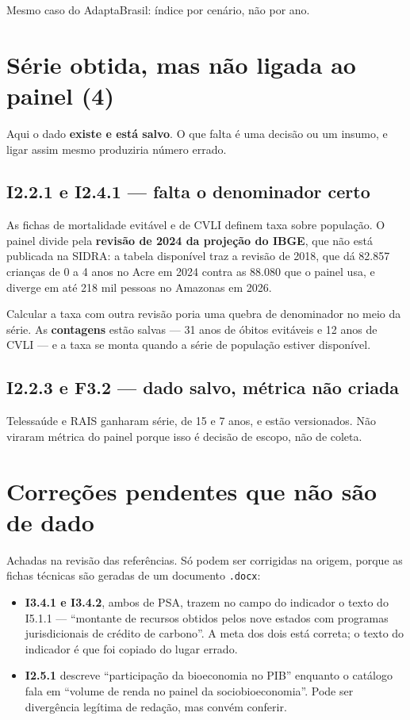 \documentclass[11pt,a4paper]{article}
\begin{document}
Mesmo caso do AdaptaBrasil: índice por cenário, não por ano.

\section{Série obtida, mas não ligada ao painel (4)}

Aqui o dado \textbf{existe e está salvo}. O que falta é uma decisão ou um insumo, e
ligar assim mesmo produziria número errado.

\subsection*{I2.2.1 e I2.4.1 --- falta o denominador certo}

As fichas de mortalidade evitável e de CVLI definem taxa sobre população. O painel
divide pela \textbf{revisão de 2024 da projeção do IBGE}, que não está publicada na
SIDRA: a tabela disponível traz a revisão de 2018, que dá 82.857 crianças de 0 a 4 anos
no Acre em 2024 contra as 88.080 que o painel usa, e diverge em até 218 mil pessoas no
Amazonas em 2026.

Calcular a taxa com outra revisão poria uma quebra de denominador no meio da série. As
\textbf{contagens} estão salvas --- 31 anos de óbitos evitáveis e 12 anos de CVLI --- e
a taxa se monta quando a série de população estiver disponível.

\subsection*{I2.2.3 e F3.2 --- dado salvo, métrica não criada}

Telessaúde e RAIS ganharam série, de 15 e 7 anos, e estão versionados. Não viraram
métrica do painel porque isso é decisão de escopo, não de coleta.

\section{Correções pendentes que não são de dado}

Achadas na revisão das referências. Só podem ser corrigidas na origem, porque as fichas
técnicas são geradas de um documento \texttt{.docx}:

\begin{itemize}
  \item \textbf{I3.4.1 e I3.4.2}, ambos de PSA, trazem no campo do indicador o texto do
    I5.1.1 --- ``montante de recursos obtidos pelos nove estados com programas
    jurisdicionais de crédito de carbono''. A meta dos dois está correta; o texto do
    indicador é que foi copiado do lugar errado.
  \item \textbf{I2.5.1} descreve ``participação da bioeconomia no PIB'' enquanto o
    catálogo fala em ``volume de renda no painel da sociobioeconomia''. Pode ser
    divergência legítima de redação, mas convém conferir.
\end{itemize}
\end{document}

